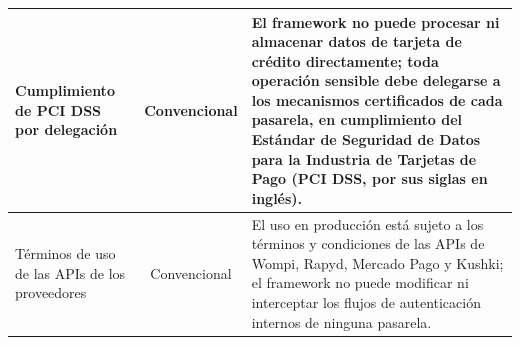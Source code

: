 \begin{table}[htbp]
\begin{tabularx}{\textwidth}{|>{\raggedright\arraybackslash}p{4cm}|c|X|}
Cumplimiento de PCI DSS por delegación & Convencional & El framework no puede procesar ni almacenar datos de tarjeta de crédito directamente; toda operación sensible debe delegarse a los mecanismos certificados de cada pasarela, en cumplimiento del Estándar de Seguridad de Datos para la Industria de Tarjetas de Pago (PCI DSS, por sus siglas en inglés). \\ \hline
Términos de uso de las APIs de los proveedores & Convencional & El uso en producción está sujeto a los términos y condiciones de las APIs de Wompi, Rapyd, Mercado Pago y Kushki; el framework no puede modificar ni interceptar los flujos de autenticación internos de ninguna pasarela. \\ \hline
\end{tabularx}
\end{table}

